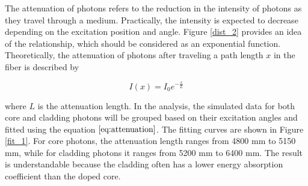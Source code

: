     The attenuation of photons refers to the reduction in the intensity of photons as they travel through a medium. Practically, the intensity is expected to decrease depending on the excitation position and angle. Figure \ref{dist_2} provides an idea of the relationship, which should be considered as an exponential function. Theoretically, the attenuation of photons after traveling a path length $x$ in the fiber is described by

    \begin{equation}
    I(x) = I_0 e^{-\frac{x}{L}}
    \label{eq:attenuation}
    \end{equation}

    where $L$ is the attenuation length. In the analysis, the simulated data for both core and cladding photons will be grouped based on their excitation angles and fitted using the equation $\ref{eq:attenuation}$. The fitting curves are shown in Figure \ref{fit_1}. For core photons, the attenuation length ranges from 4800 mm to 5150 mm, while for cladding photons it ranges from 5200 mm to 6400 mm. The result is understandable because the cladding often has a lower energy absorption coefficient than the doped core.


